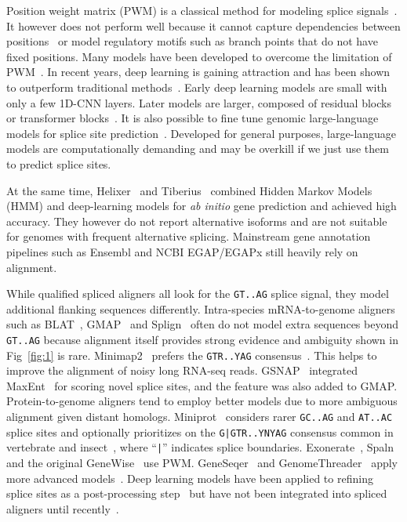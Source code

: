 \documentclass[webpdf,contemporary,large,namedate]{oup-authoring-template}%
\begin{document}
Position weight matrix (PWM) is a classical method for modeling splice signals~\citep{Staden:1984aa}.
It however does not perform well because it cannot capture dependencies between positions~\citep{Burge:1997uu}
or model regulatory motifs such as branch points that do not have fixed positions.
Many models have been developed to overcome the limitation of PWM~\citep{Capitanchik:2025aa}.
In recent years, deep learning is gaining attraction
and has been shown to outperform traditional methods~\citep{Zhang:2018aa,DBLP:journals/access/DuYDZZL18,Albaradei:2020aa}.
Early deep learning models are small with only a few 1D-CNN layers.
Later models are larger, composed of residual blocks~\citep{Jaganathan:2019aa,Zeng:2022aa,Xu:2024aa,Chao:2024aa} or transformer blocks~\citep{You:2024aa,Chen:2024aa}.
It is also possible to fine tune genomic large-language models for splice site prediction~\citep{Nguyen:2023aa,Dalla-Torre:2025aa,Brixi2025.02.18.638918}.
Developed for general purposes, large-language models are computationally demanding and may be overkill if we just use them to predict splice sites.

At the same time, Helixer~\citep{Holst2023.02.06.527280} and Tiberius~\citep{Gabriel:2024aa}
combined Hidden Markov Models (HMM) and deep-learning models for \emph{ab initio} gene prediction and achieved high accuracy.
They however do not report alternative isoforms and are not suitable for genomes with frequent alternative splicing.
Mainstream gene annotation pipelines such as Ensembl and NCBI EGAP/EGAPx still heavily rely on alignment.

While qualified spliced aligners all look for the {\tt GT..AG} splice signal,
they model additional flanking sequences differently.
Intra-species mRNA-to-genome aligners such as BLAT~\citep{Kent:2002jk}, GMAP~\citep{Wu:2005vn} and Splign~\citep{Kapustin:2008tq} often do not model extra sequences beyond {\tt GT..AG}
because alignment itself provides strong evidence and ambiguity shown in Fig~\ref{fig:1} is rare.
Minimap2~\citep{Li:2018ab} prefers the {\tt GTR..YAG} consensus~\citep{Irimia:2008aa}.
This helps to improve the alignment of noisy long RNA-seq reads.
GSNAP~\citep{Wu:2010uq} integrated MaxEnt~\citep{Yeo:2004aa} for scoring novel splice sites,
and the feature was also added to GMAP.
Protein-to-genome aligners tend to employ better models due to more ambiguous alignment given distant homologs.
Miniprot~\citep{Li:2023ab} considers rarer {\tt GC..AG} and {\tt AT..AC} splice sites and optionally prioritizes on the {\tt G|GTR..YNYAG} consensus
common in vertebrate and insect~\citep{Iwata:2011aa}, where ``{\tt |}'' indicates splice boundaries.
Exonerate~\citep{Slater:2005aa}, Spaln~\citep{Gotoh:2008aa,Iwata:2012aa,Gotoh:2024aa} and the original GeneWise~\citep{Birney:2004uy} use PWM.
GeneSeqer~\citep{Usuka:2000vi} and GenomeThreader~\citep{DBLP:journals/infsof/GremmeBSK05} apply more advanced models~\citep{Brendel:1998aa,Brendel:2004aa}.
Deep learning models have been applied to refining splice sites as a post-processing step~\citep{Chao:2024aa,Xia:2023aa}
but have not been integrated into spliced aligners until recently~\citep{Berakdar2025.04.23.650072}.
\end{document}

